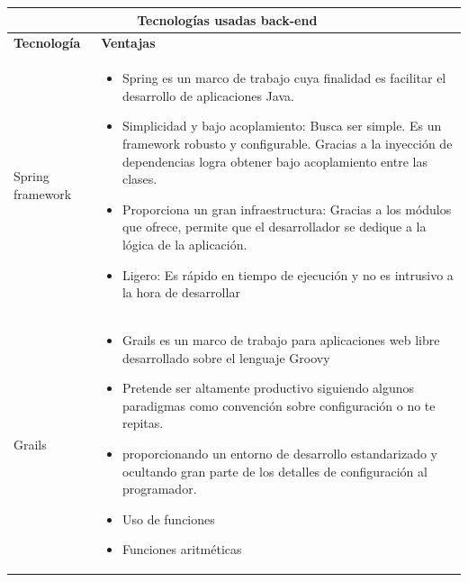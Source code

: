     \newpage
    \begin{table}[b!]
    \centering
    \vspace{10mm}  
      \begin{tabular}{|p{2cm}|ll}
        \hline
        \multicolumn{2}{|c|}{{\bf Tecnologías usadas back-end}} \\ 
        \hline
          \multicolumn{1}{|p{4cm}|}{{\bf Tecnología}} & 
      \multicolumn{1}{p{10cm}|}{{\bf Ventajas}}\\
        \hline
         \multicolumn{1}{|p{5cm}|}{Spring framework} & 
          \multicolumn{2}{p{10cm}|}{\begin{itemize}
          \vspace{-5mm}
          \item Spring es un marco de trabajo cuya finalidad es facilitar el
                desarrollo de aplicaciones Java.
         \item  Simplicidad y bajo acoplamiento: Busca ser simple. Es un
                framework robusto y configurable. Gracias a la inyección de
                dependencias logra obtener bajo acoplamiento entre las clases.
         \item  Proporciona un gran infraestructura: Gracias a los módulos
                que ofrece, permite que el desarrollador se dedique a la
                lógica de la aplicación.
         \item  Ligero: Es rápido en tiempo de ejecución y no es intrusivo a
                la hora de desarrollar
      \end{itemize}} \\
        
        \hline
         \multicolumn{1}{|p{5cm}|}{Grails}& 
          \multicolumn{1}{p{10cm}|}{
          \begin{itemize}
          \vspace{10mm}
          \item Grails es un marco de trabajo para aplicaciones web libre
                desarrollado sobre el lenguaje Groovy            
          \item Pretende ser altamente productivo siguiendo algunos paradigmas
                como convención sobre configuración o no te repitas.
         \item  proporcionando un entorno de desarrollo estandarizado y
                ocultando gran parte de los detalles de configuración al
                programador.
        \item Uso de funciones
        \item Funciones aritméticas
      \end{itemize}} \\
      \hline
      \end{tabular}
      \label{table: tecnologias usadas}
    \end{table}

